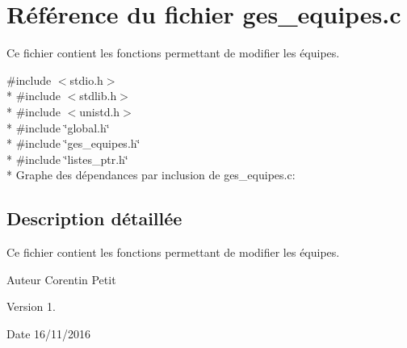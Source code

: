 \hypertarget{a00017}{}\section{Référence du fichier ges\+\_\+equipes.\+c}
\label{a00017}


Ce fichier contient les fonctions permettant de modifier les équipes.  


{\ttfamily \#include $<$stdio.\+h$>$}\\*
{\ttfamily \#include $<$stdlib.\+h$>$}\\*
{\ttfamily \#include $<$unistd.\+h$>$}\\*
{\ttfamily \#include \char`\"{}global.\+h\char`\"{}}\\*
{\ttfamily \#include \char`\"{}ges\+\_\+equipes.\+h\char`\"{}}\\*
{\ttfamily \#include \char`\"{}listes\+\_\+ptr.\+h\char`\"{}}\\*
Graphe des dépendances par inclusion de ges\+\_\+equipes.\+c\+:


\subsection{Description détaillée}
Ce fichier contient les fonctions permettant de modifier les équipes. 

\begin{DoxyAuthor}{Auteur}
Corentin Petit 
\end{DoxyAuthor}
\begin{DoxyVersion}{Version}
1. 
\end{DoxyVersion}
\begin{DoxyDate}{Date}
16/11/2016 
\end{DoxyDate}
